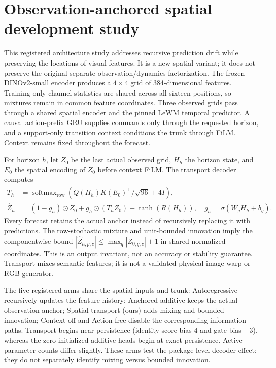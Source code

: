 \FloatBarrier
\section{Observation-anchored spatial development study}
\label{app:spatial-development}
This registered architecture study addresses recursive prediction drift while
preserving the locations of visual features. It is a new spatial variant;
it does not preserve the original separate observation/dynamics factorization.
The frozen DINOv2-small encoder produces a $4\times4$ grid of 384-dimensional
features. Training-only channel statistics are shared across all sixteen
positions, so mixtures remain in common feature coordinates. Three observed
grids pass through a shared spatial encoder and the pinned LeWM temporal
predictor. A causal action-prefix GRU supplies commands only through the
requested horizon, and a support-only transition context conditions the trunk
through FiLM. Context remains fixed throughout the forecast.

For horizon $h$, let $Z_0$ be the last actual observed grid, $H_h$ the
horizon state, and $E_0$ the spatial encoding of $Z_0$ before context FiLM.
The transport decoder computes
\begin{align}
 T_h &= \operatorname{softmax}_{\mathrm{row}}\!\left(
   Q(H_h)K(E_0)^\top/\sqrt{96}+4I\right),\\
 \widehat Z_h &= (1-g_h)\odot Z_0+g_h\odot(T_hZ_0)
                  +\tanh(R(H_h)),\quad g_h=\sigma(W_gH_h+b_g).
\end{align}
Every forecast retains the actual anchor instead of recursively replacing it
with predictions. The row-stochastic mixture and unit-bounded innovation
imply the componentwise bound $|\widehat Z_{h,p,c}|\leq
\max_q|Z_{0,q,c}|+1$ in shared normalized coordinates. This is an output
invariant, not an accuracy or stability guarantee. Transport mixes semantic
features; it is not a validated physical image warp or RGB generator.

The five registered arms share the spatial inputs and trunk: Autoregressive
recursively updates the feature history; Anchored additive keeps the actual
observation anchor; Spatial transport (ours) adds mixing and bounded innovation;
Context-off and Action-free disable the corresponding information paths.
Transport begins near persistence (identity score bias 4 and gate bias $-3$),
whereas the zero-initialized additive heads begin at exact persistence.
Active parameter counts differ slightly. These arms test the package-level
decoder effect; they do not separately identify mixing versus bounded innovation.

